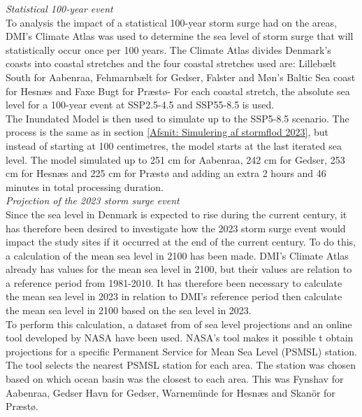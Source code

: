 \noindent
\textit{Statistical 100-year event}\\
To analysis the impact of a statistical 100-year storm surge had on the areas, DMI's Climate Atlas was used to determine the sea level of storm surge that will statistically occur once per 100 years. The Climate Atlas divides Denmark's coasts into coastal stretches and the four coastal stretches used are: Lillebælt South for Aabenraa, Fehmarnbælt for Gedser, Falster and Møn's Baltic Sea coast for Hesnæs and Faxe Bugt for Præstø- For each coastal stretch, the absolute sea level for a 100-year event at SSP2.5-4.5 and SSP55-8.5 is used.\\

The Inundated Model is then used to simulate up to the SSP5-8.5 scenario. The process is the same as in section \ref{Afsnit: Simulering af stormflod 2023}, but instead of starting at 100 centimetres, the model starts at the last iterated sea level. The model simulated up to 251 cm for Aabenraa, 242 cm for Gedser, 253 cm for Hesnæs and 225 cm for Præstø and adding an extra 2 hours and 46 minutes in total processing duration.\\

\noindent
\textit{Projection of the 2023 storm surge event}\\
Since the sea level in Denmark is expected to rise during the current century, it has therefore been desired to investigate how the 2023 storm surge event would impact the study sites if it occurred at the end of the current century. To do this, a calculation of the mean sea level in 2100 has been made. DMI's Climate Atlas already has values for the mean sea level in 2100, but their values are relation to a reference period from 1981-2010. It has therefore been necessary to calculate the mean sea level in 2023 in relation to DMI's reference period then calculate the mean sea level in 2100 based on the sea level in 2023.\\

To perform this calculation, a dataset from \cite{garner_ipcc_2021} of sea level projections and an online tool developed by NASA \citep{NASA_tool} have been used. NASA's tool makes it possible t obtain projections for a specific Permanent Service for Mean Sea Level (PSMSL) station. The tool selects the nearest PSMSL station for each area. The station was chosen based on which ocean basin was the closest to each area. This was Fynshav for Aabenraa, Gedser Havn for Gedser, Warnemünde for Hesnæs and Skanör for Præstø.\\

